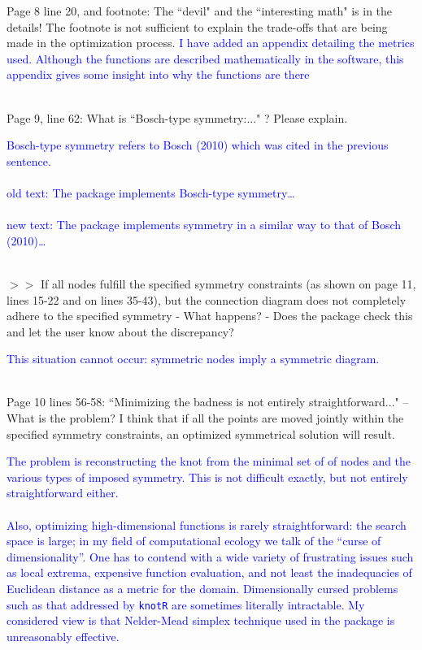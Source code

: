 \documentclass[12pt]{article}
\begin{document}
Page 8 line 20, and footnote: The ``devil" and the ``interesting math"
is in the details!  The footnote is not sufficient to explain the
trade-offs that are being made in the optimization process.
\textcolor{blue}{I have added an appendix detailing the metrics used.
  Although the functions are described mathematically in the software,
  this appendix gives some insight into why the functions are
  there\\ \\}

Page 9, line 62: What is ``Bosch-type symmetry:..." ?  Please explain.

\textcolor{blue}{Bosch-type symmetry refers to Bosch (2010) which was
  cited in the previous sentence.\\ \\ old text: The package
  implements Bosch-type symmetry\ldots \\ \\ new text: The package
  implements symmetry in a similar way to that of Bosch
  (2010)\ldots\\ \\}
  
$>>$ If all nodes fulfill the specified symmetry constraints (as shown
on page 11, lines 15-22 and on lines 35-43), but the connection
diagram does not completely adhere to the specified symmetry - What
happens? - Does the package check this and let the user know about the
discrepancy?

\textcolor{blue}{This situation cannot occur: symmetric nodes imply a
  symmetric diagram.\\ \\}

Page 10 lines 56-58: ``Minimizing the badness is not entirely
straightforward..."  -- What is the problem?  I think that if all the
points are moved jointly within the specified symmetry constraints, an
optimized symmetrical solution will result.

\textcolor{blue}{The problem is reconstructing the knot from the
  minimal set of of nodes and the various types of imposed symmetry.
  This is not difficult exactly, but not entirely straightforward
  either.\\ \\ Also, optimizing high-dimensional functions is rarely
  straightforward: the search space is large; in my field of
  computational ecology we talk of the ``curse of dimensionality''.
  One has to contend with a wide variety of frustrating issues such as
  local extrema, expensive function evaluation, and not least the
  inadequacies of Euclidean distance as a metric for the domain.
  Dimensionally cursed problems such as that addressed by {\tt knotR}
  are sometimes literally intractable.  My considered view is that
  Nelder-Mead simplex technique used in the package is unreasonably
  effective.\\ \\ }
\end{document}
